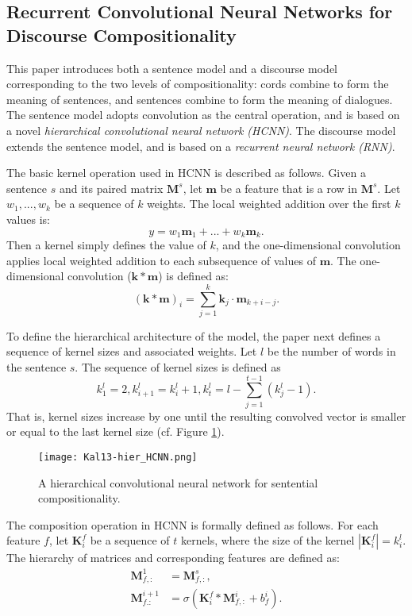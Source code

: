 \subsection{Recurrent Convolutional Neural Networks for Discourse Compositionality \cite{Kalchbrenner2013}}

This paper introduces both a sentence model and a discourse model corresponding to the two levels of compositionality: cords combine to form the meaning of sentences, and sentences combine to form the meaning of dialogues. The sentence model adopts convolution as the central operation, and is based on a novel \emph{hierarchical convolutional neural network (HCNN)}. The discourse model extends the sentence model, and is based on a \emph{recurrent neural network (RNN)}.

The basic kernel operation used in HCNN is described as follows. Given a sentence $s$ and its paired matrix $\mathbf{M}^s$, let $\mathbf{m}$ be a feature that is a row in $\mathbf{M}^s$. Let $w_1, ..., w_k$ be a sequence of $k$ weights. The local weighted addition over the first $k$ values is:
$$y = w_1 \mathbf{m}_1 + ... + w_k \mathbf{m}_k.$$
Then a kernel simply defines the value of $k$, and the one-dimensional convolution applies local weighted addition to each subsequence of values of $\mathbf{m}$. The one-dimensional convolution ($\mathbf{k} * \mathbf{m}$) is defined as:
$$(\mathbf{k} * \mathbf{m})_i = \sum_{j=1}^k \mathbf{k}_j \cdot \mathbf{m}_{k+i-j}.$$

To define the hierarchical architecture of the model, the paper next defines a sequence of kernel sizes and associated weights. Let $l$ be the number of words in the sentence $s$. The sequence of kernel sizes is defined as
$$k_1^l = 2, k_{i+1}^l = k_i^l + 1, k_t^l = l - \sum_{j=1}^{t-1}(k_j^l - 1).$$
That is, kernel sizes increase by one until the resulting convolved vector is smaller or equal to the last kernel size (cf. Figure \ref{fig:Kal13-hier}).

\begin{figure}[h]
  \centering
  \texttt{[image: Kal13-hier\_HCNN.png]}\\
  \caption{A hierarchical convolutional neural network for sentential compositionality.}\label{fig:Kal13-hier}
\end{figure}

The composition operation in HCNN is formally defined as follows. For each feature $f$, let $\mathbf{K}_i^f$ be a sequence of $t$ kernels, where the size of the kernel $|\mathbf{K}_i^f| = k_i^l$. The hierarchy of matrices and corresponding features are defined as:
\begin{align*}
\mathbf{M}_{f,:}^1 &= \mathbf{M}_{f,:}^s,\\
\mathbf{M}_{f.:}^{i+1} &= \sigma(\mathbf{K}_i^f * \mathbf{M}_{f,:}^i + b_f^i).
\end{align*}

